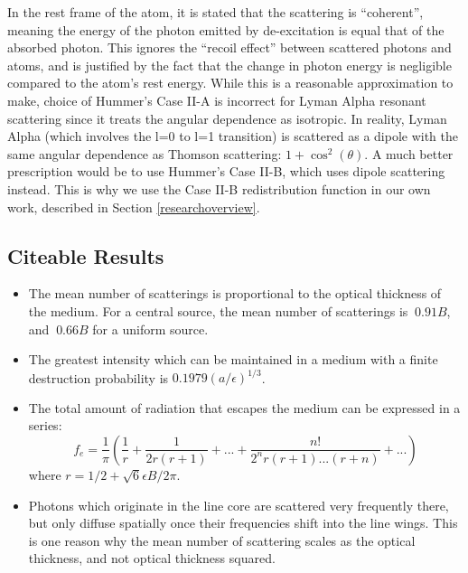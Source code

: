 \documentclass[onecolumn]{aastex63}
\begin{document}
In the rest frame of the atom, it is stated that the scattering is ``coherent'', meaning the energy of the photon emitted by de-excitation is equal that of the absorbed photon. This ignores the ``recoil effect'' between scattered photons and atoms, and is justified by the fact that the change in photon energy is negligible compared to the atom's rest energy. While this is a reasonable approximation to make, choice of Hummer's Case II-A is incorrect for Lyman Alpha resonant scattering since it treats the angular dependence as isotropic. In reality, Lyman Alpha (which involves the l=0 to l=1 transition) is scattered as a dipole with the same angular dependence as Thomson scattering: $1+\cos^2(\theta)$. A much better prescription would be to use Hummer's Case II-B, which uses dipole scattering instead. This is why we use the Case II-B redistribution function in our own work, described in Section \ref{researchoverview}.

\subsection{Citeable Results}
\begin{itemize}
    \item The mean number of scatterings is proportional to the optical thickness of the medium. For a central source, the mean number of scatterings is $~0.91B$, and $~0.66B$ for a uniform source.
    \item The greatest intensity which can be maintained in a medium with a finite destruction probability is $0.1979(a/\epsilon)^{1/3}$. 
    \item The total amount of radiation that escapes the medium can be expressed in a series:
    \begin{equation}
        f_e = \frac{1}{\pi}\left(\frac{1}{r} + \frac{1}{2r(r+1)} + ... + \frac{n!}{2^n r(r+1)...(r+n)}+...\right)
    \end{equation}
    where $r=1/2 + \sqrt{6}\epsilon B/2\pi$.
    \item Photons which originate in the line core are scattered very frequently there, but only diffuse spatially once their frequencies shift into the line wings. This is one reason why the mean number of scattering scales as the optical thickness, and not optical thickness squared.
\end{itemize}
\end{document}
